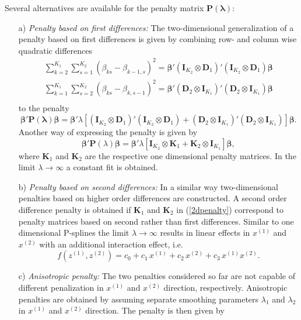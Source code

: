\documentclass[11pt,a4paper,twoside]{bayesxarticle}
\def \Kvec {\vec{K}}
\def \Pvec {\vec{P}}
\def \lambdavec {\boldsymbol{\lambda}}
\def \betavec {\boldsymbol{\beta}}
\def \Dvec {\mathbf{D}}
\def \Kvec {\mathbf{K}}
\def \Ivec {\mathbf{I}}
\def \Pvec {\mathbf{P}}
\begin{document}
Several alternatives are available for the penalty matrix $\Pvec(\lambdavec)$:
\begin{enumerate}
\item[a)] {\em Penalty based on first differences:} The
two-dimensional generalization of a penalty based on first
differences is given by combining row- and column wise quadratic
differences
$$
\begin{array}{l}
\displaystyle \sum_{k=2}^{K_1}\sum_{s=1}^{K_2}(\beta_{ks}-\beta_{k-1,s})^2 =
\betavec'(\Ivec_{K_2}\otimes \Dvec_1)'(\Ivec_{K_2}\otimes \Dvec_1)\betavec \\[0.4cm]
\displaystyle  \sum_{k=1}^{K_1}\sum_{s=2}^{K_2}(\beta_{ks}-\beta_{k,s-1})^2 =
\betavec'(\Dvec_2\otimes \Ivec_{K_1})'(\Dvec_2\otimes \Ivec_{K_1})\betavec \\
\end{array}
$$
to the penalty
$$
\betavec'\Pvec(\lambdavec) \betavec =  \betavec' \lambda \left[ (\Ivec_{K_2}\otimes \Dvec_1)'(\Ivec_{K_2}\otimes \Dvec_1) + (\Dvec_2\otimes \Ivec_{K_1})'
(\Dvec_2\otimes \Ivec_{K_1})\right]\betavec.
$$
Another way of expressing the penalty is given by
\begin{equation}
\label{2dpenalty}
 \betavec'\Pvec(\lambda)\betavec = \betavec'\lambda \left[\Ivec_{K_2}\otimes\Kvec_1 + \Kvec_2\otimes \Ivec_{K_1}\right]\betavec,
\end{equation}
where $\Kvec_1$ and $\Kvec_2$ are the respective one dimensional penalty matrices.
In the limit  $\lambda \rightarrow \infty$ a constant fit is obtained.
\item[b)] {\em Penalty based on second differences:} In a similar way two-dimensional penalties based on higher order differences
are constructed. A second order difference penalty is obtained if
$\Kvec_1$ and $\Kvec_2$ in (\ref{2dpenalty}) correspond to penalty
matrices based on second rather than first differences. Similar to
one dimensional P-splines the limit $\lambda \rightarrow \infty$
results in linear effects in $x^{(1)}$ and $x^{(2)}$ with an
additional interaction effect, i.e.
$$
f\left(z^{(1)},z^{(2)}\right) = c_0 + c_1 \, x^{(1)} + c_2 \,
x^{(2)} + c_3 \, x^{(1)} x^{(2)}.
$$
\item[c)] {\em Anisotropic penalty:} The two penalties considered so far are not capable of
different penalization in $x^{(1)}$ and $x^{(2)}$ direction,
respectively. Anisotropic penalties are obtained by assuming
separate smoothing parameters $\lambda_1$ and $\lambda_2$ in
$x^{(1)}$ and $x^{(2)}$ direction. The penalty is then given by
\begin{equation}

\end{equation}
\end{enumerate}
\end{document}
